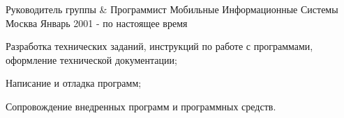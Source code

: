 

\begin{cventries}

  \cventry
    {Руководитель группы \& Программист} %
    {Мобильные Информационные Системы} %
    {Москва} %
    {Январь 2001 - по настоящее время} %
    {
      \begin{cvitems} %
        \item {Разработка технических заданий, инструкций по работе с программами, оформление технической документации;}
        \item {Написание и отладка программ;}
        \item {Сопровождение внедренных программ и программных средств.}
      \end{cvitems}
    }

\end{cventries}
